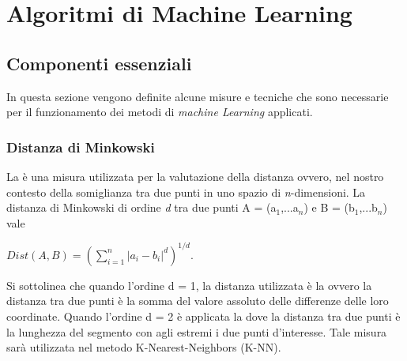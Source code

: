 
\chapter{Algoritmi di Machine Learning}
\label{cap:ML}
\section{Componenti essenziali}
In questa sezione vengono definite alcune misure e tecniche che sono necessarie per il funzionamento dei metodi di \emph{machine Learning} applicati.
\subsection{Distanza di Minkowski}
La \textit{\cite{minkdist}} è una misura utilizzata per la valutazione della distanza ovvero, nel nostro contesto della somiglianza tra due punti in uno spazio di \textit{n}-dimensioni. La distanza di Minkowski di ordine \emph{d} tra due punti A = (a$_1$,...a$_n$) e B = (b$_1$,...b$_n$) vale
\begin{center}
	$Dist(A,B) =  \left(\sum_{i = 1}^{n}|a_i-b_i|^d\right)^{1/d} $.
\end{center}

Si sottolinea che quando l'ordine d = 1, la distanza utilizzata è la \textit{\cite{manhattan}} ovvero la distanza tra due punti è la somma del valore assoluto delle differenze delle loro coordinate. Quando l'ordine d = 2 è applicata la \textit{\cite{euclidea}} dove la distanza tra due punti è la lunghezza del segmento con agli estremi i due punti d'interesse.
Tale misura sarà utilizzata nel metodo K-Nearest-Neighbors (K-NN).
